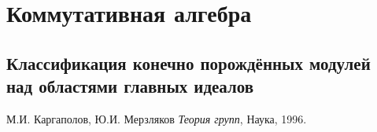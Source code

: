 \documentclass[12pt]{amsart}
\numberwithin{theorem}{subsection}
\theoremstyle{definition}
\begin{document}


\newpage
\section{Коммутативная алгебра}

\subsection{Классификация конечно порождённых модулей над областями главных идеалов}




\begin{thebibliography}{2}
	
	 М.И. Каргаполов, Ю.И. Мерзляков {\it Теория групп}, Наука, 1996.
	

\end{thebibliography}

	
\end{document}
